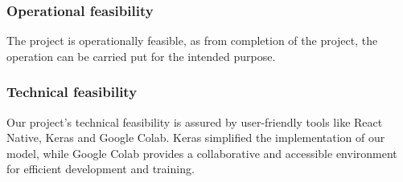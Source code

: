 \subsubsection{Operational feasibility}
The project is operationally feasible, as from  completion of the project, the operation can be carried put for the intended purpose.

\subsubsection{Technical feasibility}
Our project's technical feasibility is assured by user-friendly tools like React Native, Keras and Google Colab. Keras simplified the implementation of our model, while Google Colab provides a collaborative and accessible environment for efficient development and training.

